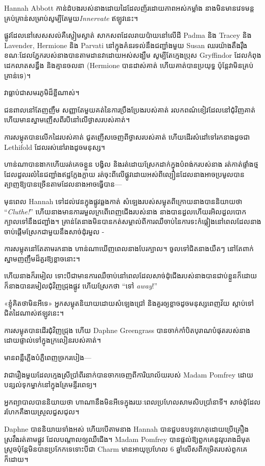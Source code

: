 {{{\later

Hannah Abbott កាន់ដំបងរបស់នាងដោយដៃដែលញ័រដោយភាពអស់កម្លាំង នាងមិនមានវេទមន្តគ្រប់គ្រាន់សម្រាប់សូម្បីតែមួយ\emph{Innervate} ឥឡូវនេះ។

ផ្លូវដែលនៅសេសសល់គឺស្ងៀមស្ងាត់ សាកសពដែលរាយប៉ាយនៅលើដី Padma និង Tracey និង Lavender, Hermione និង Parvati នៅក្នុងគំនរទល់នឹងជញ្ជាំងមួយ Susan ឈរយ៉ាងតឹងរ៉ឹង ខណៈដែលភ្នែករបស់នាងបានតាមដានវាដោយអស់សង្ឃឹម សូម្បីតែក្មេងប្រុស Gryffindor ដែលកំពុងដេកលាតសន្ធឹង និងគ្មានចលនា (Hermione បានដាស់គាត់ ហើយគាត់បានប្រយុទ្ធ ប៉ុន្តែវាមិនគ្រប់គ្រាន់ទេ)។

វាធ្លាប់ជាសមរភូមិដ៏ខ្លីណាស់។

ជនពាលនៅតែញញឹម សញ្ញាតែមួយគត់នៃការប្រឹងប្រែងរបស់គាត់ រលកពណ៌ខៀវដែលនៅជុំវិញគាត់ ហើយមានស្នាមញើសពីរបីនៅលើថ្ងាសរបស់គាត់។

ការសម្លុតបានលើកដៃរបស់គាត់ ជូតញើសចេញពីថ្ងាសរបស់គាត់ ហើយដើរសំដៅទៅរកនាងដូចជា Lethifold ដែលរស់នៅរាងដូចមនុស្ស។

ហាន់ណាបានងាកហើយរត់គេចខ្លួន បង្វិល និងរត់ដោយស្រែកដាក់ក្នុងបំពង់ករបស់នាង រត់កាត់ផ្ទាំងថ្មដែលដួលរលំនៃជញ្ជាំងឥដ្ឋក្លែងក្លាយ រត់ចុះពីលើផ្លូវដោយអស់ពីល្បឿនដែលនាងអាចប្រមូលបាន ត្បាញឱ្យបានច្រើនតាមដែលនាងអាចធ្វើបាន—

មុនពេល Hannah ទៅដល់វេនក្នុងផ្លូវឆ្លងកាត់ សំឡេងរបស់សម្លុតពីក្រោយនាងបាននិយាយថា “\emph{Cluthe!}” ហើយនាងមានការរមួលក្រពើពេញជើងរបស់នាង នាងបានដួលហើយរអិលដួលបោកក្បាលទៅនឹងជញ្ជាំង។ គ្រាន់តែនាងមិនបានកត់សម្គាល់ពីការឈឺចាប់នៃការទះកំផ្លៀងនៅពេលដែលនាងចាប់ផ្តើមស្រែកជាមួយនឹងសាច់ដុំរមួល -

ការសម្លុតនៅតែតាមរកនាង ហាន់ណាឃើញពេលនាងបែរក្បាល។ ចូលទៅជិតនាងយឺតៗ នៅតែពាក់ស្នាមញញឹមដ៏គួរឱ្យខ្លាចនោះ។

ហើយនាងក៏រមៀល ទោះបីជាមានការឈឺចាប់នៅពេលដែលសាច់ដុំជើងរបស់នាងបានជាប់ខ្លួនក៏ដោយ ក៏នាងបានរមៀលជុំវិញជ្រុងផ្លូវ ហើយស្រែកថា “ទៅ \emph{away}!”

«ខ្ញុំ​គិត​ថា​មិន​អី​ទេ» អ្នក​សម្លុត​និយាយ​ដោយ​សំឡេង​ជ្រៅ និង​គួរ​ឲ្យ​ខ្លាច​ដូច​មនុស្ស​ពេញ​វ័យ ស្តាប់​ទៅ​ជិត​ដៃ​ណាស់​ឥឡូវ​នេះ។

ការសម្លុតបានដើរជុំវិញជ្រុង ហើយ Daphne Greengrass បានចាក់កាំបិតបុរាណបំផុតរបស់នាងដោយផ្ទាល់ទៅក្នុងក្រលៀនរបស់គាត់។

មានពន្លឺភ្លើងបំភ្លឺពេញច្រករបៀង—

\later

វា​ជា​រឿង​មួយ​ដែល​ក្មេង​ស្រី​ប្រាំពីរ​នាក់​បាន​ចាក​ចេញ​ពី​ការិយាល័យ​របស់ Madam Pomfrey ដោយ​បន្សល់​ទុក​ម្នាក់​នៅ​ក្នុង​គ្រែ​មន្ទីរពេទ្យ។

អ្នកព្យាបាលបាននិយាយថា ហាណានឹងមិនអីទេក្នុងរយៈពេលប្រហែលសាមសិបប្រាំនាទី។ សាច់ដុំដែលរហែកគឺងាយស្រួលជួសជុល។

Daphne បាន​និយាយ​ទាំង​អស់ ហើយ​បើ​តាម​នាង Hannah បាន​ជួប​ឧបទ្ទវហេតុ​ដោយ​ប្រើ​គ្រឿង​ស្រវឹង​រត់​តាម​ផ្លូវ ដែល​បណ្តាល​ឲ្យ​ឈឺ​ជើង។ Madam Pomfrey បានផ្តល់ឱ្យពួកគេនូវរូបរាងដ៏មុតស្រួចប៉ុន្តែមិនបានប្រកែកទេទោះបីជា Charm មានអាយុប្រហែល 6 ឆ្នាំលើសពីកម្រិតរបស់ពួកគេក៏ដោយ។

}}}
